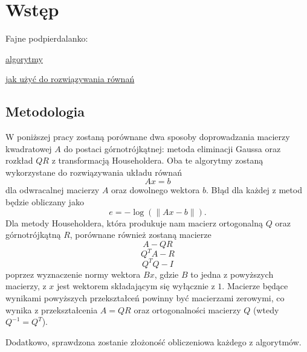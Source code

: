 \section{Wstęp}

Fajne podpierdalanko:

\href{https://people.inf.ethz.ch/gander/papers/qrneu.pdf}{algorytmy}

\href{https://inst.eecs.berkeley.edu/~ee127/sp21/livebook/l_lineqs_solving.html}{jak użyć do rozwiązywania równań}

\subsection{Metodologia}

W poniższej pracy zostaną porównane dwa sposoby doprowadzania macierzy kwadratowej $A$ do postaci górnotrójkątnej: metoda eliminacji Gaussa oraz rozkład $QR$ z transformacją Householdera. Oba te algorytmy zostaną wykorzystane do rozwiązywania układu równań 
$$Ax=b$$
dla odwracalnej macierzy $A$ oraz dowolnego wektora $b$. Błąd dla każdej z metod będzie obliczany jako
$$e=-\log(\|Ax-b\|).$$
Dla metody Householdera, która produkuje nam macierz ortogonalną $Q$ oraz górnotrójkątną $R$, porównane również zostaną macierze
$$A-QR$$
$$Q^TA-R$$
$$Q^TQ-I$$
poprzez wyznaczenie normy wektora $Bx$, gdzie $B$ to jedna z powyższych macierzy, z $x$ jest wektorem składającym się wyłącznie z $1$. Macierze będące wynikami powyższych przekształceń powinny być macierzami zerowymi, co wynika z przekształcenia $A=QR$ oraz ortogonalności macierzy $Q$ (wtedy $Q^{-1}=Q^T$).

Dodatkowo, sprawdzona zostanie złożoność obliczeniowa każdego z algorytmów.